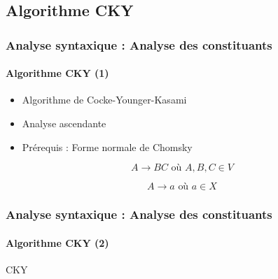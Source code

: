 \documentclass[xcolor=table]{beamer}
\begin{document}
\subsection{Algorithme CKY}

\begin{frame}
\frametitle{Analyse syntaxique : Analyse des constituants}
\framesubtitle{Algorithme CKY (1)}

\begin{itemize}
	\item Algorithme de Cocke-Younger-Kasami
	\item Analyse ascendante
	\item Prérequis : Forme normale de Chomsky
\end{itemize}

\begin{definition}
	\[
	A \rightarrow  B C \text{ où } A, B, C \in V
	\]
	
	\[
	A \rightarrow a \text{ où } a \in X
	\]
\end{definition}

\end{frame}

\begin{frame}
\frametitle{Analyse syntaxique : Analyse des constituants}
\framesubtitle{Algorithme CKY (2)}

\begin{block}{CKY}
	\scriptsize
	\begin{algorithm}[H]
		
%		
%		
%		
%		
%		
		
	\end{algorithm}
\end{block}

\end{frame}
\end{document}
